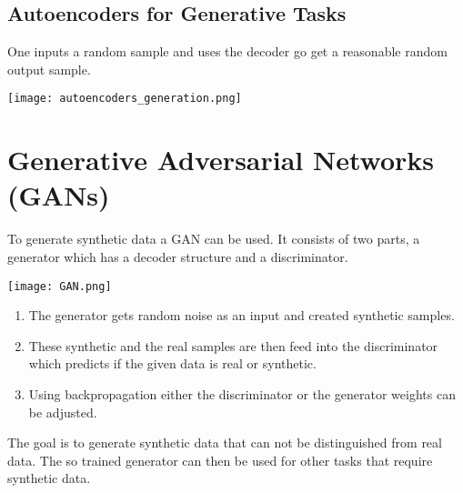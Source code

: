\subsection{Autoencoders for Generative Tasks}
One inputs a random sample and uses the decoder go get a reasonable random output sample.
\begin{center}
    \texttt{[image: autoencoders\_generation.png]}
\end{center}

\section{Generative Adversarial Networks (GANs)}

To generate synthetic data a GAN can be used. It consists of two parts, a generator which has a decoder structure and a discriminator. 
\begin{center}
    \texttt{[image: GAN.png]}
\end{center}
\begin{enumerate}
    \item The generator gets random noise as an input and created synthetic samples.
    \item These synthetic and the real samples are then feed into the discriminator which predicts if the given data is real or synthetic.
    \item Using backpropagation either the discriminator or the generator weights can be adjusted.
\end{enumerate}
The goal is to generate synthetic data that can not be distinguished from real data. The so trained generator can then be used for other tasks that require synthetic data.